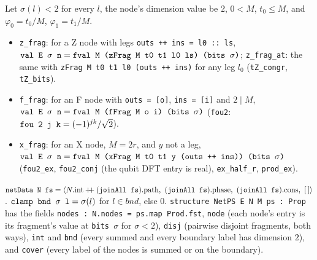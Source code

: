 \begin{theorem}
Let $\sigma(l)<2$ for every $l$, the node's dimension value be $2$, $0<M$, $t_0\le M$, and
$\varphi_0 = t_0/M$, $\varphi_1 = t_1/M$.
\begin{itemize}
\item \textnormal{\texttt{z\_\allowbreak{}frag}}: for a Z node with legs \textnormal{\texttt{outs ++ ins = l0 :: ls}},
  $\textnormal{\texttt{val E \ensuremath{\sigma} n}} = \textnormal{\texttt{fval M (\allowbreak{}zFrag M t0 t1 l0 ls) (\allowbreak{}bits \ensuremath{\sigma})}}$; \textnormal{\texttt{z\_\allowbreak{}frag\_\allowbreak{}at}}: the same with
  \textnormal{\texttt{zFrag M t0 t1 l0 (\allowbreak{}outs ++ ins)}} for any leg $l_0$ (\textnormal{\texttt{tZ\_\allowbreak{}congr}}, \textnormal{\texttt{tZ\_\allowbreak{}bits}}).
\item \textnormal{\texttt{f\_\allowbreak{}frag}}: for an F node with \textnormal{\texttt{outs = [o]}}, \textnormal{\texttt{ins = [i]}} and $2\mid M$,
  $\textnormal{\texttt{val E \ensuremath{\sigma} n}} = \textnormal{\texttt{fval M (\allowbreak{}fFrag M o i) (\allowbreak{}bits \ensuremath{\sigma})}}$ (\textnormal{\texttt{fou2}}:
  $\textnormal{\texttt{fou 2 j k}} = (-1)^{jk}/\sqrt2$).
\item \textnormal{\texttt{x\_\allowbreak{}frag}}: for an X node, $M=2r$, and $y$ not a leg,
  $\textnormal{\texttt{val E \ensuremath{\sigma} n}} = \textnormal{\texttt{fval M (\allowbreak{}xFrag M t0 t1 y (\allowbreak{}outs ++ ins)) (\allowbreak{}bits \ensuremath{\sigma})}}$ (\textnormal{\texttt{fou2\_\allowbreak{}ex}},
  \textnormal{\texttt{fou2\_\allowbreak{}conj}} (the qubit DFT entry is real), \textnormal{\texttt{ex\_\allowbreak{}half\_\allowbreak{}r}}, \textnormal{\texttt{prod\_\allowbreak{}ex}}).
\end{itemize}
\end{theorem}

\begin{definition}\label{def:lean-pathsum-netps}
$\textnormal{\texttt{netData N fs}} = \langle N.\text{int}\mathbin{+\!\!+}(\textnormal{\texttt{joinAll fs}}).\text{path},\ (\textnormal{\texttt{joinAll fs}}).\text{phase},\ (\textnormal{\texttt{joinAll fs}}).\text{cons},\ [\,]\rangle$.
$\textnormal{\texttt{clamp bnd \ensuremath{\sigma} l}} = \sigma(l)$ for $l\in bnd$, else $0$.
\textnormal{\texttt{structure NetPS E N M ps : Prop}} has the fields
\textnormal{\texttt{nodes : N.\allowbreak{}nodes = ps.\allowbreak{}map Prod.\allowbreak{}fst}},
\textnormal{\texttt{node}} (each node's entry is its fragment's value at \textnormal{\texttt{bits \ensuremath{\sigma}}} for $\sigma<2$),
\textnormal{\texttt{disj}} (pairwise disjoint fragments, both ways),
\textnormal{\texttt{int}} and \textnormal{\texttt{bnd}} (every summed and every boundary label has dimension $2$), and
\textnormal{\texttt{cover}} (every label of the nodes is summed or on the boundary).
\end{definition}

